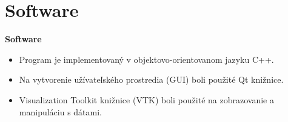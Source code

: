 \documentclass{beamer}
\begin{document}

\section{Software}

\begin{frame}{\textbf{Software}}
	\begin{itemize}
	\item Program je implementovaný v objektovo-orientovanom jazyku C++. 
	
	\vspace{2mm}
	\item Na vytvorenie užívateľského prostredia (GUI) boli použité Qt knižnice.
	
	\vspace{2mm}
	\item Visualization Toolkit knižnice (VTK) boli použité na zobrazovanie a manipuláciu s dátami.
	\end{itemize}
\end{frame}
\end{document}
